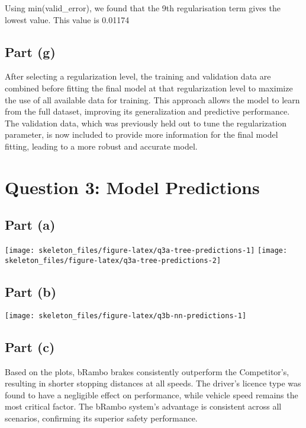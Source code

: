 \documentclass[12pt,halfline,a4paper,]{ouparticle}
\begin{document}
Using min(valid\_error), we found that the 9th regularisation term gives
the lowest value. This value is 0.01174

\subsection{Part (g)}\label{part-g}

After selecting a regularization level, the training and validation data
are combined before fitting the final model at that regularization level
to maximize the use of all available data for training. This approach
allows the model to learn from the full dataset, improving its
generalization and predictive performance. The validation data, which
was previously held out to tune the regularization parameter, is now
included to provide more information for the final model fitting,
leading to a more robust and accurate model.

\section{Question 3: Model
Predictions}\label{question-3-model-predictions}

\subsection{Part (a)}\label{part-a-2}

\texttt{[image: skeleton\_files/figure-latex/q3a-tree-predictions-1]}
\texttt{[image: skeleton\_files/figure-latex/q3a-tree-predictions-2]}

\subsection{Part (b)}\label{part-b-2}

\texttt{[image: skeleton\_files/figure-latex/q3b-nn-predictions-1]}

\subsection{Part (c)}\label{part-c-1}

Based on the plots, bRambo brakes consistently outperform the
Competitor's, resulting in shorter stopping distances at all speeds. The
driver's licence type was found to have a negligible effect on
performance, while vehicle speed remains the most critical factor. The
bRambo system's advantage is consistent across all scenarios, confirming
its superior safety performance.
\end{document}
